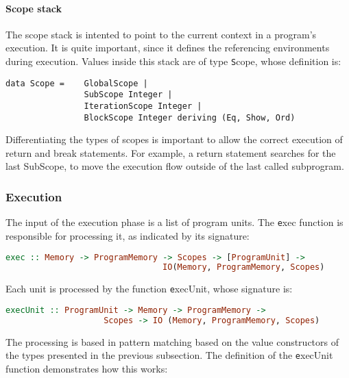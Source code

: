 \paragraph{Scope stack}

The scope stack is intented to point to the current
context in a program's execution. It is quite important,
since it defines the referencing environments during
execution. Values inside this stack are of type 
{\texttt Scope}, whose definition is:

\begin{lstlisting}[language=Gryph, basicstyle=\footnotesize]
data Scope =    GlobalScope | 
                SubScope Integer | 
                IterationScope Integer | 
                BlockScope Integer deriving (Eq, Show, Ord)
\end{lstlisting}

Differentiating the types of scopes is important to allow the correct execution of 
return and break statements. For example, a return statement searches for the
last SubScope, to move the execution flow outside of the last called subprogram.

\subsubsection{Execution}

The input of the execution phase is a list of program units. The {\texttt exec}
function is responsible for processing it, as indicated by its
signature:

\begin{lstlisting}[language=Haskell, basicstyle=\footnotesize]
exec :: Memory -> ProgramMemory -> Scopes -> [ProgramUnit] -> 
                                IO(Memory, ProgramMemory, Scopes) 
\end{lstlisting}

Each unit is processed by the function {\texttt execUnit}, whose signature is:

\begin{lstlisting}[language=Haskell, basicstyle=\footnotesize]
execUnit :: ProgramUnit -> Memory -> ProgramMemory -> 
                    Scopes -> IO (Memory, ProgramMemory, Scopes)
\end{lstlisting}

The processing is based in pattern matching based on the value constructors
of the types presented in the previous subsection. The definition of the
{\texttt execUnit} function demonstrates how this works:


